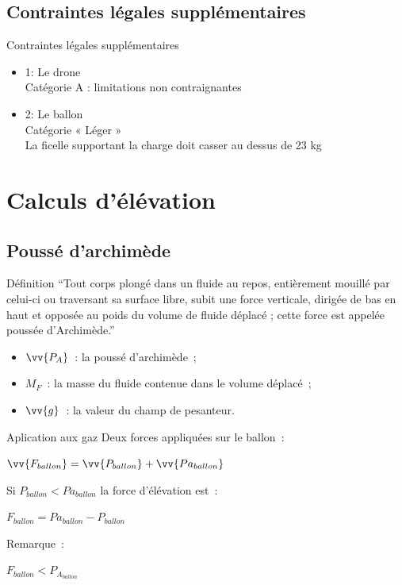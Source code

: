 \documentclass{beamer}
\begin{document}
\subsection{Contraintes légales supplémentaires}
\begin{frame}{Contraintes légales supplémentaires}
  \begin{itemize}
    \item 1: Le drone \\
	    Catégorie A : limitations non contraignantes
    \item 2: Le ballon \\
	    Catégorie « Léger » \\
	    La ficelle supportant la charge doit casser au dessus de 23 kg
 \end{itemize}
\end{frame}

\section{Calculs d'élévation}

\subsection{Poussé d'archimède}

\begin{frame}{Définition}
  \enquote{Tout corps plongé dans un fluide au repos, entièrement mouillé par celui-ci ou traversant sa surface libre, subit une force verticale, dirigée de bas en haut et opposée au poids du volume de fluide déplacé ; cette force est appelée poussée d'Archimède.}
  \bigbreak
  \begin{center}
  \end{center}
  \begin{itemize}
    \item $\vv{P_A}$~: la poussé d'archimède~;
    \item $M_F$~: la masse du fluide contenue dans le volume déplacé~;
    \item $\vv{g}$~: la valeur du champ de pesanteur.
  \end{itemize}
\end{frame}

\begin{frame}{Aplication aux gaz}
  Deux forces appliquées sur le ballon~: \\
  \begin{center}
    $\displaystyle{\vv{F_{ballon}} = \vv{P_{ballon}} + \vv{Pa_{ballon}}}$ \\
  \end{center}
  Si $P_{ballon} < Pa_{ballon}$ la force d'élévation est~:
  \begin{center}
    $\displaystyle{F_{ballon} = Pa_{ballon} - P_{ballon}}$ \\
  \end{center}
  Remarque~:\\
  \begin{center}
    $F_{ballon} < P_{A_{ballon}}$
  \end{center}
\end{frame}
\end{document}
